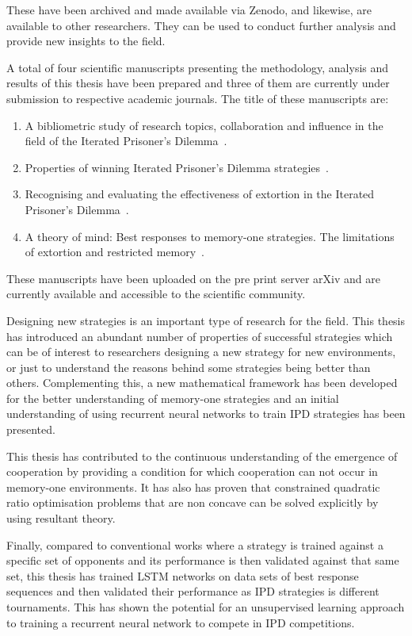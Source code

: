 These have been archived and made available via Zenodo, and likewise, are
available to other researchers. They can be used to conduct further analysis and
provide new insights to the field.

A total of four scientific manuscripts presenting the methodology, analysis and
results of this thesis have been prepared and three of them are currently under
submission to respective academic journals. The title of these manuscripts are:

\begin{enumerate}
    \item A bibliometric study of research topics, collaboration and influence
    in the field of the Iterated Prisoner's Dilemma~\cite{Glynatsi2019_bibliometric}.
    \item Properties of winning Iterated Prisoner's Dilemma
    strategies~\cite{Glynatsi2020meta_article}.
    \item Recognising and evaluating the effectiveness of extortion in the
    Iterated Prisoner's Dilemma~\cite{Knight2019}.
    \item A theory of mind: Best responses to memory-one strategies.
    The limitations of extortion and restricted memory~\cite{Glynatsi2019theory}.
\end{enumerate}

These manuscripts have been uploaded on the pre
print server arXiv and are currently available and accessible to the scientific
community.

Designing new strategies is an important type of research for the field.
This thesis has introduced an abundant number of properties of successful
strategies which can be of interest to researchers designing a new strategy
for new environments, or just to understand the reasons behind some strategies
being better than others. Complementing this, a new mathematical framework has
been developed for the better understanding of memory-one strategies and an
initial understanding of using recurrent neural networks to train IPD
strategies has been presented.

This thesis has contributed to the continuous understanding of the emergence of
cooperation by providing a condition for which cooperation can not occur in
memory-one environments. It has also has proven that constrained quadratic
ratio optimisation problems that are non concave can be solved explicitly by
using resultant theory.

Finally, compared to conventional works where a strategy is trained against a
specific set of opponents and its performance is then validated against that
same set, this thesis has trained LSTM networks on data sets of best response
sequences and then validated their performance as IPD strategies is
\metatournamentslstm different tournaments. This has shown the potential for an
unsupervised learning approach to training a recurrent neural network to compete
in IPD competitions.

